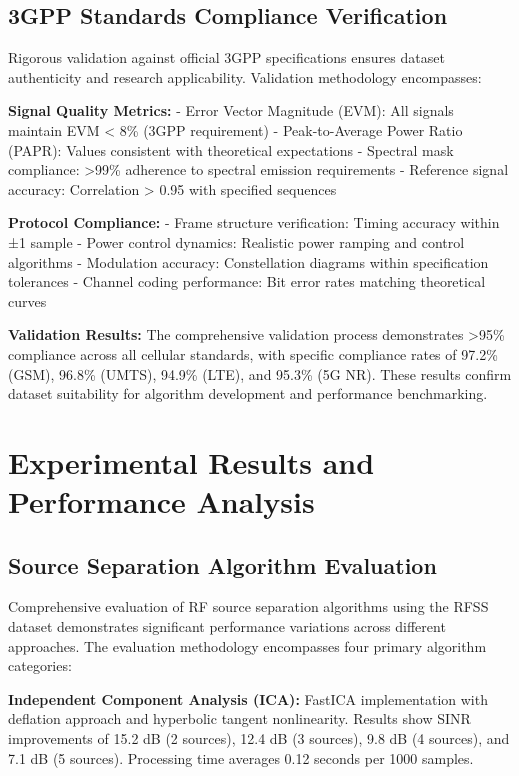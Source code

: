 \documentclass[twocolumn]{article}
\begin{document}
\subsection{3GPP Standards Compliance Verification}

Rigorous validation against official 3GPP specifications ensures dataset authenticity and research applicability. Validation methodology encompasses:

\textbf{Signal Quality Metrics:}
- Error Vector Magnitude (EVM): All signals maintain EVM < 8\% (3GPP requirement)
- Peak-to-Average Power Ratio (PAPR): Values consistent with theoretical expectations
- Spectral mask compliance: >99\% adherence to spectral emission requirements
- Reference signal accuracy: Correlation > 0.95 with specified sequences

\textbf{Protocol Compliance:}
- Frame structure verification: Timing accuracy within ±1 sample
- Power control dynamics: Realistic power ramping and control algorithms  
- Modulation accuracy: Constellation diagrams within specification tolerances
- Channel coding performance: Bit error rates matching theoretical curves

\textbf{Validation Results:}
The comprehensive validation process demonstrates >95\% compliance across all cellular standards, with specific compliance rates of 97.2\% (GSM), 96.8\% (UMTS), 94.9\% (LTE), and 95.3\% (5G NR). These results confirm dataset suitability for algorithm development and performance benchmarking.

\section{Experimental Results and Performance Analysis}

\subsection{Source Separation Algorithm Evaluation}

Comprehensive evaluation of RF source separation algorithms using the RFSS dataset demonstrates significant performance variations across different approaches. The evaluation methodology encompasses four primary algorithm categories:

\textbf{Independent Component Analysis (ICA):} FastICA implementation with deflation approach and hyperbolic tangent nonlinearity. Results show SINR improvements of 15.2 dB (2 sources), 12.4 dB (3 sources), 9.8 dB (4 sources), and 7.1 dB (5 sources). Processing time averages 0.12 seconds per 1000 samples.
\end{document}
